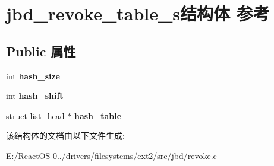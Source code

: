 \hypertarget{structjbd__revoke__table__s}{}\section{jbd\+\_\+revoke\+\_\+table\+\_\+s结构体 参考}
\label{structjbd__revoke__table__s}
\subsection*{Public 属性}
\begin{DoxyCompactItemize}
\item 
\mbox{\label{structjbd__revoke__table__s_a79a4d7c836706eadf1bc70775d8ec75e}} 
int {\bfseries hash\+\_\+size}
\item 
\mbox{\label{structjbd__revoke__table__s_a7d7ff422f9ced6a8684f733e33e74fe4}} 
int {\bfseries hash\+\_\+shift}
\item 
\mbox{\label{structjbd__revoke__table__s_a19413c7832b3c414c10b088c133ce39d}} 
\hyperlink{interfacestruct}{struct} \hyperlink{structlist__head}{list\+\_\+head} $\ast$ {\bfseries hash\+\_\+table}
\end{DoxyCompactItemize}


该结构体的文档由以下文件生成\+:\begin{DoxyCompactItemize}
\item 
E\+:/\+React\+O\+S-\/0../drivers/filesystems/ext2/src/jbd/revoke.\+c\end{DoxyCompactItemize}
